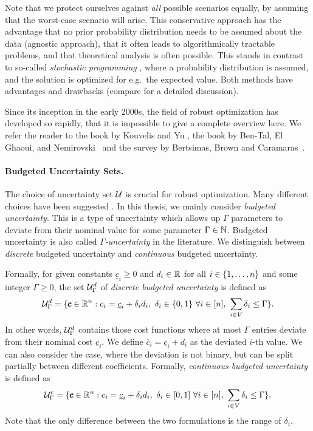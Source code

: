 Note that we protect ourselves against \emph{all} possible scenarios equally, by assuming that the worst-case scenario will arise. This conservative approach has the advantage that no prior probability distribution needs to be assumed about the data (agnostic approach), that it often leads to algorithmically tractable problems, and that theoretical analysis is often possible. This stands in contrast to so-called \emph{stochastic programming} \cite{birge2011introduction}, where a probability distribution is assumed, and the solution is optimized for e.g.\ the expected value. Both methods have advantages and drawbacks (compare \cite{ben2009robust} for a detailed discussion).  
 
Since its inception in the early 2000s, the field of robust optimization has developed so rapidly, that it is impossible to give a complete overview here. We refer the reader to the book by Kouvelis and Yu \cite{kouvelis2013robust}, the book by Ben-Tal, El Ghaoui, and Nemirovski~\cite{ben2009robust} and the survey by Bertsimas, Brown and Caramaras~\cite{bertsimas2011theory}. 

\paragraph*{Budgeted Uncertainty Sets.}
The choice of uncertainty set $\mathcal{U}$ is crucial for robust optimization. Many different choices have been suggested \cite{poss2018robust,busing2012new,bertsimas2004robust,kasperski2016robust}. In this thesis, we mainly consider \emph{budgeted uncertainty}. This is a type of uncertainty which allows up $\Gamma$ parameters to deviate from their nominal value for some parameter $\Gamma \in \mathbb{N}$. Budgeted uncertainty is also called \emph{$\Gamma$-uncertainty} in the literature. We distinguish between \emph{discrete} budgeted uncertainty and \emph{continuous} budgeted uncertainty.

Formally, for given constants $\underline{c}_i \geq 0$ and $d_i \in \mathbb{R}$ for all $i \in \{ 1, \ldots, n \}$ and some integer $\Gamma \geq 0$, the set $\mathcal{U}^d_\Gamma$ of \emph{discrete budgeted uncertainty} is defined as
\[
\mathcal{U}^d_\Gamma = \{  \pmb c \in \mathbb{R}^n : c_i = \underline{c}_i + \delta_id_i,\  \delta_i \in \{ 0,1 \}\ \forall i \in [n],\ \sum_{i \in V}\delta_i \leq \Gamma  \}.
\]
In other words, $\mathcal{U}^d_\Gamma$ contains those cost functions where at most $\Gamma$ entries deviate from their nominal cost $\underline{c}_i$. We define $\overline{c}_i = \underline{c}_i + d_i$ as the deviated $i$-th value. We can also consider the case, where the deviation is not binary, but can be split partially between different coefficients. Formally, \emph{continuous budgeted uncertainty} is defined as
\[
\cU^c_\Gamma = \set{ \pmb c \in \R^n : c_i = \underline{c}_i + \delta_id_i,\  \delta_i \in [0,1]\ \forall i \in [n],\ \sum_{i \in V}\delta_i \leq \Gamma }.
\]
Note that the only difference between the two formulations is the range of $\delta_i$.

